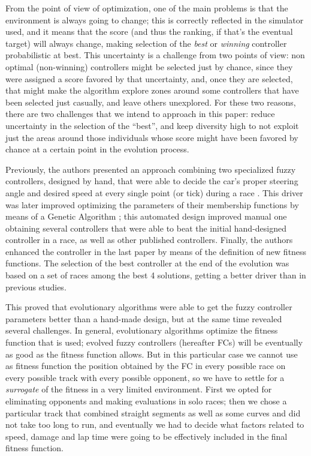 \documentclass[conference]{IEEEtran}
\begin{document}
From the point of view of optimization, one of the main problems is
that the environment is always going to change; this is correctly
reflected in the simulator used, and it means that the score (and
thus the ranking, if that's the eventual target) will always change,
making selection of the {\em best} or {\em winning} controller
probabilistic at best. This uncertainty is a challenge from two points
of view: non optimal (non-winning) controllers might be selected just
by chance, since they were assigned a score favored by that
uncertainty, and, once they are selected, that might make the
algorithm explore zones around some controllers that have been
selected just casually, and leave others unexplored. For these two
reasons, there are two challenges that we intend to approach in this
paper: reduce uncertainty in the selection of the ``best'', and keep
diversity high to not exploit just the areas around those individuals
whose score might have been favored by chance at a certain point in
the evolution process.

Previously, the authors presented an approach combining two specialized fuzzy controllers, designed by hand, that were able to decide the car's proper steering angle and desired speed at every single point (or tick) during a race \cite{salem_evo17}. This driver was later improved \cite{salem_evo18} optimizing the parameters of their membership functions by means of a Genetic Algorithm
\cite{GAs_Goldberg89}; this automated design improved manual one
obtaining several controllers that were able to beat the initial
hand-designed controller in a race, as well as other published
controllers. Finally, the authors enhanced the controller in the last paper \cite{salem_cig2018} by means of the definition of new fitness functions. The selection of the best controller at the end of the evolution was based on a set of races among the best 4 solutions, getting a better driver than in previous studies.

This proved that evolutionary algorithms were able to get the fuzzy
controller parameters better than a hand-made design, but at the same
time revealed several challenges. In general, evolutionary algorithms
optimize the fitness function that is used; evolved fuzzy controllers
(hereafter FCs) will be eventually as good as the fitness function allows. 
But in this particular case we cannot use as fitness function the position
obtained by the FC in every possible race on every possible track with
every possible opponent, so we have to settle for a {\em surrogate} of
the fitness in a very limited environment. First we opted for
eliminating opponents and making evaluations in solo races; then we
chose a particular track that combined straight segments as well as
some curves and did not take too long to run, and eventually we had to
decide what factors related to speed, damage and lap time were going
to be effectively included in the final fitness function. 
\end{document}
